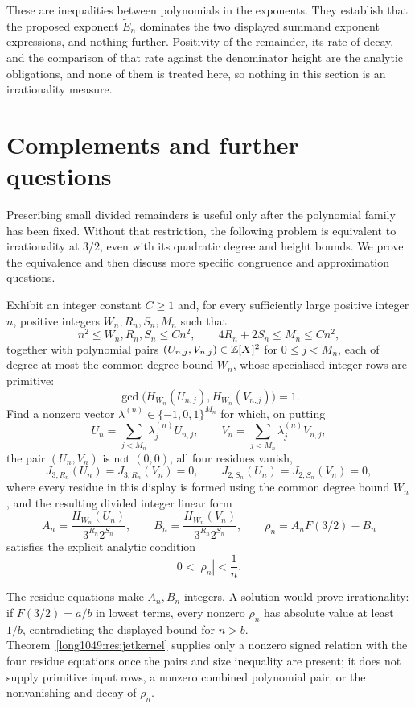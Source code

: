 \documentclass[11pt]{article}
\begin{document}
These are inequalities between polynomials in the exponents. They
establish that the proposed exponent $\widetilde{E}_n$ dominates the two
displayed summand exponent expressions, and nothing further.  Positivity of the remainder, its rate of
decay, and the comparison of that rate against the denominator height are the
analytic obligations, and none of them is treated here, so nothing in this
section is an irrationality measure.

\section{Complements and further questions}\label{long1049:sec:open}

Prescribing small divided remainders is useful only after the
polynomial family has been fixed. Without that restriction, the
following problem is equivalent to irrationality at $3/2$, even
with its quadratic degree and height bounds. We prove the
equivalence and then discuss more specific congruence and
approximation questions.

\begin{problem}\label{long1049:prob:kernel}
Exhibit an integer constant \(C\ge1\) and, for every sufficiently large
positive integer \(n\), positive integers \(W_n,R_n,S_n,M_n\) such that
\[
 n^2\le W_n,R_n,S_n\le Cn^2,
 \qquad 4R_n+2S_n\le M_n\le Cn^2,
\]
together with polynomial pairs
\((U_{n,j},V_{n,j})\in\mathbb{Z}[X]^2\) for \(0\le j<M_n\), each of degree at most
the common degree bound \(W_n\), whose specialised integer rows are
primitive:
\[
 \gcd\!\bigl(H_{W_n}(U_{n,j}),H_{W_n}(V_{n,j})\bigr)=1.
\]
Find a nonzero vector
\(\lambda^{(n)}\in\{-1,0,1\}^{M_n}\) for which, on putting
\[
 U_n=\sum_{j<M_n}\lambda^{(n)}_jU_{n,j},
 \qquad V_n=\sum_{j<M_n}\lambda^{(n)}_jV_{n,j},
\]
the pair \((U_n,V_n)\) is not \((0,0)\), all four residues vanish,
\[
 J_{3,R_n}(U_n)=J_{3,R_n}(V_n)=0,
 \qquad J_{2,S_n}(U_n)=J_{2,S_n}(V_n)=0,
\]
where every residue in this display is formed using the common degree bound \(W_n\),
and the resulting divided integer linear form
\[
 A_n=\frac{H_{W_n}(U_n)}{3^{R_n}2^{S_n}},
 \qquad
 B_n=\frac{H_{W_n}(V_n)}{3^{R_n}2^{S_n}},
 \qquad
 \rho_n=A_nF(3/2)-B_n
\]
satisfies the explicit analytic condition
\[
 0<|\rho_n|<\frac1n.
\]
\end{problem}

The residue equations make \(A_n,B_n\) integers.  A solution would prove
irrationality: if \(F(3/2)=a/b\) in lowest terms, every nonzero \(\rho_n\) has
absolute value at least \(1/b\), contradicting the displayed bound for
\(n>b\).  Theorem~\ref{long1049:res:jetkernel} supplies only a nonzero signed relation
with the four residue equations once the pairs and size inequality are present; it
does not supply primitive input rows, a nonzero combined polynomial pair, or
the nonvanishing and decay of \(\rho_n\).
\end{document}
